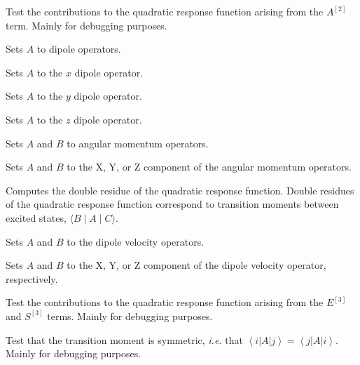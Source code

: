 \begin{description}

\item{}
Test the contributions to the quadratic response function arising from
the $A^{\left[2\right]}$ term. Mainly for debugging purposes.

\item{}
Sets $A$ to dipole operators.

\item{}
Sets $A$ to the $x$ dipole operator.

\item{}
Sets $A$ to the $y$ dipole operator.

\item{}
Sets $A$ to the $z$ dipole operator.

\item{}
Sets $A$ and $B$ to angular momentum operators.

\item{}
Sets $A$ and $B$ to the X, Y, or Z component of the angular momentum operators.

\item{}
Computes the double residue
of the quadratic
response function.
Double residues of the quadratic response function correspond to transition
moments between excited states,
$\langle B \mid A \mid C \rangle$.

\item{}
Sets $A$ and $B$ to the dipole velocity operators.

\item{}
Sets $A$ and $B$ to the X, Y, or Z component of the dipole velocity
operator, respectively.

\item{}
Test the contributions to the quadratic response function arising from
the $E^{\left[3\right]}$ and $S^{\left[3\right]}$ terms.  Mainly for
debugging purposes.

\item{}
Test that the transition moment is symmetric, {\it i.e.\/} that
$\left<i\left|A\right|j\right> =
\left<j\left|A\right|i\right>$. Mainly for debugging purposes.


\end{description}
